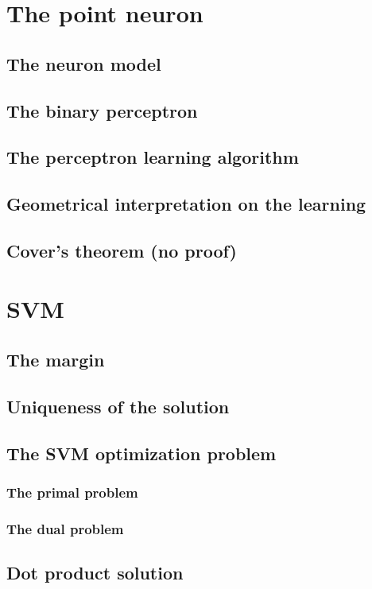 \documentclass[11pt]{book} %
\begin{document}
%
%
%


\section{The point neuron}
\subsection{The neuron model}
\subsection{The binary perceptron}
\subsection{The perceptron learning algorithm}
\subsection{Geometrical interpretation on the learning}
\subsection{Cover's theorem (no proof)}

%
%
%


\section{SVM}
\subsection{The margin}
\subsection{Uniqueness of the solution}
\subsection{The SVM optimization problem}
\subsubsection{The primal problem}
\subsubsection{The dual problem}
\subsection{Dot product solution}
\end{document}
